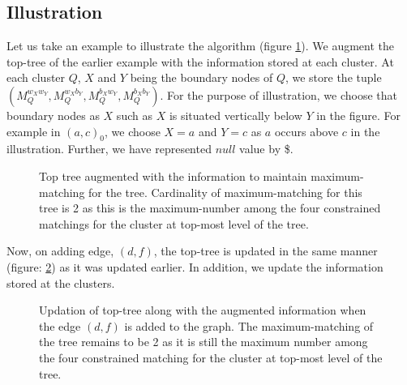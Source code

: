 \documentclass[a4paper,12pt]{article}
\begin{document}
\subsection{Illustration}
Let us take an example to illustrate the algorithm (figure \ref{fig:top-tree-aug}). We augment the top-tree of the earlier example with the information stored at each cluster. At each cluster $Q$, $X$ and $Y$ being the boundary nodes of $Q$, we store the tuple $(M_{Q}^{w_{X}w_{Y}}, M_{Q}^{w_{X}b_{Y}}, M_{Q}^{b_{X}w_{Y}}, M_{Q}^{b_{X}b_{Y}})$. For the purpose of illustration, we choose that boundary nodes as $X$ such as $X$ is situated vertically below $Y$ in the figure. For example in $(a,c)_{0}$, we choose $X=a$ and $Y=c$ as $a$ occurs above $c$ in the illustration. Further, we have represented $null$ value by \$.
\begin{figure}

\caption{Top tree augmented with the information to maintain maximum-matching for the tree. Cardinality of maximum-matching for this tree is 2 as this is the maximum-number among the four constrained matchings for the cluster at top-most level of the tree.}
\label{fig:top-tree-aug}
\end{figure}

Now, on adding edge, $(d,f)$, the top-tree is updated in the same manner (figure: \ref{fig:top-tree-upd}) as it was updated earlier. In addition, we update the information stored at the clusters.


\begin{figure}
\caption{Updation of top-tree along with the augmented information when the edge $(d,f)$ is added to the graph. The maximum-matching of the tree remains to be 2 as it is still the maximum number among the four constrained matching for the cluster at top-most level of the tree.}
\label{fig:top-tree-upd}
\end{figure}
\end{document}
